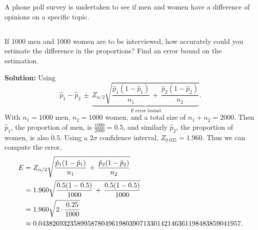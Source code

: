 \section{}
A phone poll survey is undertaken to see if men and women have a difference of opinions on a specific topic.
\subsection{}
    If 1000 men and 1000 women are to be interviewed, how accurately could you estimate the difference in the proportions?  Find an error bound on the estimation.
    \begin{mybox}
        \textbf{Solution: } Using
        $$\hat{p}_1-\hat{p}_2 \,\pm\, \underbrace{Z_{\alpha/2}\sqrt{ \frac{\hat{p}_1(1-\hat{p}_1)}{n_1}   \, + \, \frac{\hat{p}_2(1-\hat{p}_2)}{n_2}  }}_{E \text{ error bound}}.$$
        With $n_1 = 1000$ men, $n_2 = 1000$ women, and a total size of $n_1+n_2 = 2000$. Then $\hat{p}_1$, the proportion of men, is $\frac{1000}{2000} = 0.5$, and similarly $\hat{p}_2$, the proportion of women, is also $0.5$. Using a $2\sigma$ confidence interval, $Z_{0.025} = 1.960$. Thus we can compute the error,
        \begin{align}
            E &= Z_{\alpha/2}\sqrt{ \frac{\hat{p}_1(1-\hat{p}_1)}{n_1}   \, + \, \frac{\hat{p}_2(1-\hat{p}_2)}{n_2}  } \notag\\
            &= 1.960 \sqrt{ \frac{0.5(1-0.5) }{1000} \, + \, \frac{0.5(1-0.5)}{1000}}\notag\\
            &= 1.960 \sqrt{2 \cdot \frac{0.25}{1000}}\notag\\
            &\approx 0.0438269323589958780496198039071330142146361198483859041957.\notag
        \end{align}
    \end{mybox}
    \newpage
